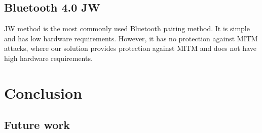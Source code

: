 \documentclass[12pt]{article}
\begin{document}
\newpage
\subsection{Bluetooth 4.0 JW}
\label{sub:Bluetooth 4.0 JW}

JW method is the most commonly used Bluetooth pairing method. It is simple and has low hardware requirements. However, it has no protection against MITM attacks, where our solution provides protection against MITM and does not have high hardware requirements.

\section{Conclusion}
\label{sec:Conclusion}
\subsection{Future work}
\label{sub:future work}

\newpage


\nocite{*}

\end{document}
